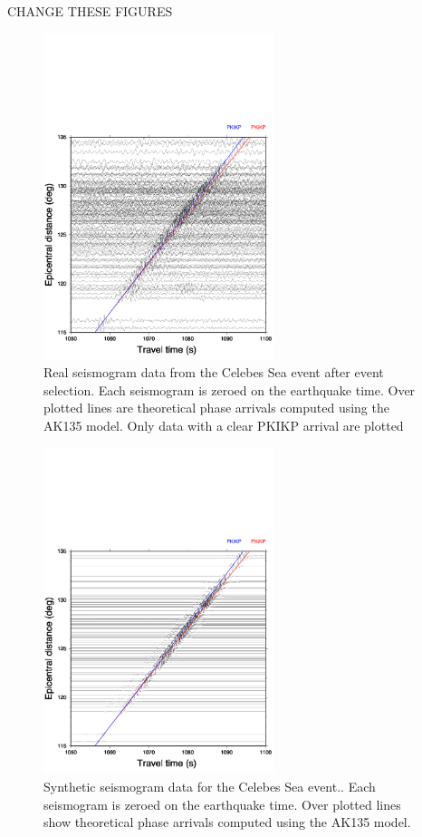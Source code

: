 \documentclass[11pt,a4paper]{article}
\begin{document}
CHANGE THESE FIGURES
\begin{figure}
	\centering
	\includegraphics[width=0.6\textwidth]{figures/celebessea/celebessea_real.pdf}
	\caption{Real seismogram data from the Celebes Sea event after event selection. Each seismogram is zeroed on the earthquake time. Over plotted lines are theoretical phase arrivals computed using the AK135 model. Only data with a clear PKIKP arrival are plotted}
	\label{fig:Real nonaligned}
\end{figure}

\begin{figure}
	\centering
	\includegraphics[width=0.6\textwidth]{figures/celebessea/celebessea_synthetic_both.pdf}
	\caption{Synthetic seismogram data for the Celebes Sea event.. Each seismogram is zeroed on the earthquake time. Over plotted lines show theoretical phase arrivals computed using the AK135 model.}
	\label{fig:Synth nonaligned}
\end{figure}
\end{document}
